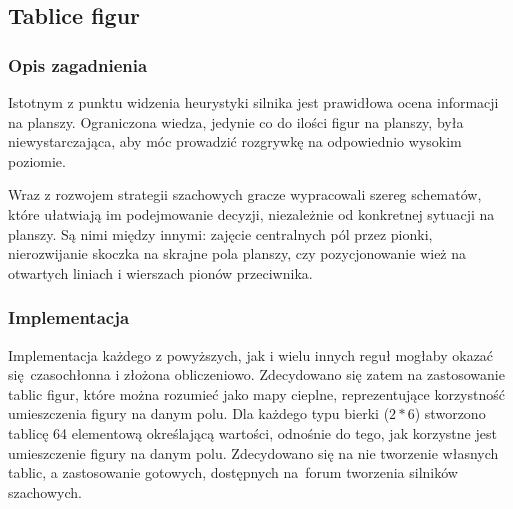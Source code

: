 \subsection{Tablice figur}
\label{subsec:tablice-figur}

\subsubsection{Opis zagadnienia}
Istotnym z punktu widzenia heurystyki silnika jest prawidłowa ocena informacji na planszy.
Ograniczona wiedza, jedynie co do ilości figur na planszy, była niewystarczająca, aby móc prowadzić rozgrywkę na odpowiednio wysokim poziomie.

Wraz z rozwojem strategii szachowych gracze wypracowali szereg schematów, które ułatwiają im podejmowanie decyzji, niezależnie od konkretnej sytuacji na planszy.
Są nimi między innymi: zajęcie centralnych pól przez pionki, nierozwijanie skoczka na skrajne pola planszy, czy pozycjonowanie wież na otwartych liniach i wierszach pionów przeciwnika.

\subsubsection{Implementacja}
Implementacja każdego z powyższych, jak i wielu innych reguł mogłaby okazać się~czasochłonna i złożona obliczeniowo.
Zdecydowano się zatem na zastosowanie tablic figur, które można rozumieć jako mapy cieplne, reprezentujące korzystność umieszczenia figury na danym polu.
Dla każdego typu bierki ($2*6$) stworzono tablicę 64 elementową określającą wartości, odnośnie do tego, jak korzystne jest umieszczenie figury na danym polu.
Zdecydowano się na nie tworzenie własnych tablic, a zastosowanie gotowych, dostępnych na~forum tworzenia silników szachowych. \cite*{wiki-tablica-figur}

